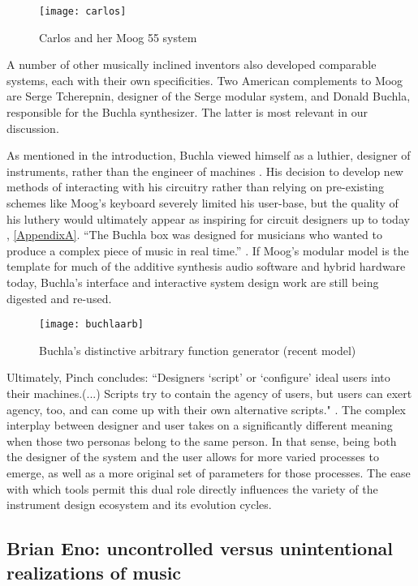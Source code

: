 \begin{itemize}
	\begin{figure}[h!]
	  \caption{Carlos and her Moog 55 system}
	  \centering
	    \texttt{[image: carlos]}
	\end{figure}

A number of other musically inclined inventors also developed comparable systems, each with their own specificities. Two American complements to Moog are Serge Tcherepnin, designer of the Serge modular system, and Donald Buchla, responsible for the Buchla synthesizer. The latter is most relevant in our discussion. 

As mentioned in the introduction, Buchla viewed himself as a luthier, designer of instruments, rather than the engineer of machines \citep{pinch2001}. His decision to develop new methods of interacting with his circuitry rather than relying on pre-existing schemes like Moog's keyboard severely limited his user-base, but the quality of his luthery would ultimately appear as inspiring for circuit designers up to today \citep{rylan2015}, \ref{AppendixA}. ``The Buchla box was designed for musicians who wanted to produce a complex piece of music in real time.'' \cite[p47]{pinch2002}. If Moog's modular model is the template for much of the additive synthesis audio software and hybrid hardware today, Buchla's interface and interactive system design work are still being digested and re-used. 

	\begin{figure}[h!]
	  \caption{Buchla's distinctive arbitrary function generator (recent model)}
	  \centering
	    \texttt{[image: buchlaarb]}
	\end{figure}

Ultimately, Pinch concludes: ``Designers `script' or `configure' ideal users into their machines.(...) Scripts try to contain the agency of users, but users can exert agency, too, and can come up with their own alternative scripts." \cite[p.311]{pinch2002}. The complex interplay between designer and user takes on a significantly different meaning when those two personas belong to the same person. In that sense, being both the designer of the system and the user allows for more varied processes to emerge, as well as a more original set of parameters for those processes. The ease with which tools permit this dual role directly influences the variety of the instrument design ecosystem and its evolution cycles. 

\subsection{Brian Eno: uncontrolled versus unintentional realizations of music}


\end{itemize}
